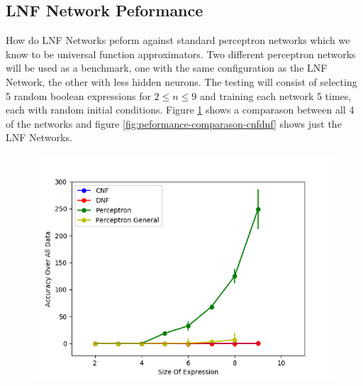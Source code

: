\subsection{LNF Network Peformance}
How do LNF Networks peform against standard perceptron networks which we know to be universal function approximators. Two different perceptron networks will be used as a benchmark, one with the same configuration as the LNF Network, the other with less hidden neurons. The testing will consist of selecting 5 random boolean expressions for $2 \leq n \leq 9$ and training each network 5 times, each with random initial conditions. Figure \ref{fig:peformance-comparason-all} shows a comparason between all 4 of the networks and figure \ref{fig:peformance-comparason-cnfdnf} shows just the LNF Networks.

\begin{figure}[H]
  \centering
  \begin{minipage}[b]{0.8\textwidth}
    \includegraphics[width=\textwidth]{All-Peformance-Comparason.png}
    \caption{}
    \label{fig:peformance-comparason-all}
  \end{minipage}
  \hfill
\end{figure}

